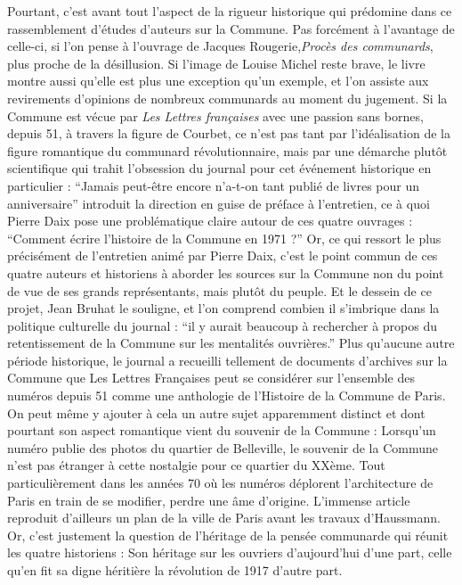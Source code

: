 	Pourtant, c’est avant tout l’aspect de la rigueur historique qui prédomine dans ce rassemblement d’études d’auteurs sur la Commune. Pas forcément à l’avantage de celle-ci, si l’on pense à l’ouvrage de Jacques Rougerie,\emph{Procès des communards}, plus proche de la désillusion. Si l’image de Louise Michel reste brave, le livre montre aussi qu’elle est plus une exception qu’un exemple, et l’on assiste aux revirements d’opinions de nombreux communards au moment du jugement. Si la Commune est vécue par \emph{Les Lettres françaises} avec une passion sans bornes, depuis 51, à travers la figure de Courbet, ce n’est pas tant par l’idéalisation de la figure romantique du communard révolutionnaire, mais par une démarche plutôt scientifique qui trahit l’obsession du journal pour cet événement historique en particulier : \enquote{Jamais peut-être encore n’a-t-on tant publié de livres pour un anniversaire} introduit la direction en guise de préface à l’entretien, ce à quoi Pierre Daix pose une problématique claire autour de ces quatre ouvrages : \enquote{Comment écrire l’histoire de la Commune en 1971 ?} Or, ce qui ressort le plus précisément de l’entretien animé par Pierre Daix, c’est le point commun de ces quatre auteurs et historiens à aborder les sources sur la Commune non du point de vue de ses grands représentants, mais plutôt du peuple. Et le dessein de ce projet, Jean Bruhat le souligne, et l’on comprend combien il s’imbrique dans la politique culturelle du journal : \enquote{il y aurait beaucoup à rechercher à propos du retentissement de la Commune sur les mentalités ouvrières.}
	Plus qu’aucune autre période historique, le journal a recueilli tellement de documents d’archives sur la Commune que Les Lettres Françaises peut se considérer sur l’ensemble des numéros depuis 51 comme une anthologie de l’Histoire de la Commune de Paris. On peut même y ajouter à cela un autre sujet apparemment distinct et dont pourtant son aspect romantique vient du souvenir de la Commune : Lorsqu’un numéro publie des photos du quartier de Belleville, le souvenir de la Commune n’est pas étranger à cette nostalgie pour ce quartier du XXème. Tout particulièrement dans les années 70 où les numéros déplorent l’architecture de Paris en train de se modifier, perdre une âme d’origine. L’immense article reproduit d’ailleurs un plan de la ville de Paris avant les travaux d’Haussmann. Or, c’est justement la question de l’héritage de la pensée communarde qui réunit les quatre historiens : Son héritage sur les ouvriers d’aujourd’hui d’une part, celle qu’en fit sa digne héritière la révolution de 1917 d’autre part. 


